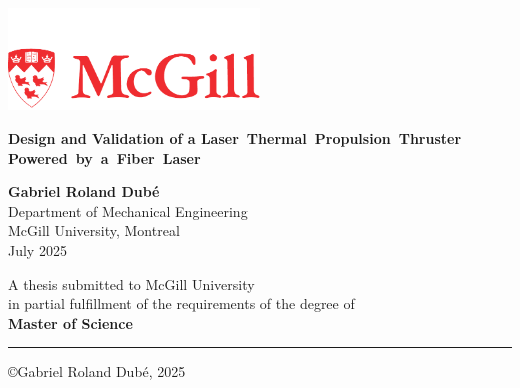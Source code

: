 \begin{titlepage}
  \thispagestyle{empty}
  \sffamily
  \begin{center}
    \includegraphics[width=0.5\textwidth]{assets/McGill_logo.pdf} \\
    \vspace*{2cm}
    
    \huge
    \textbf{Design and Validation of a Laser~Thermal~Propulsion~Thruster Powered~by~a~Fiber~Laser}
    
    \large

    
    \vspace{1.5cm}    
    \textbf{Gabriel Roland Dubé}\\

    
    \vspace{0.5cm}
    Department of Mechanical Engineering\\
    McGill University, Montreal\\

    \vspace{1.5cm}
    July 2025\\
    \vspace{1.5cm}
    
    A thesis submitted to McGill University \\
    in partial fulfillment of the requirements of the degree of\\
    \textbf{Master of Science}\\
    
    \vfill

    {\color{red}\hrule}

    \copyright Gabriel Roland Dubé, 2025
            
  \end{center}
\end{titlepage}